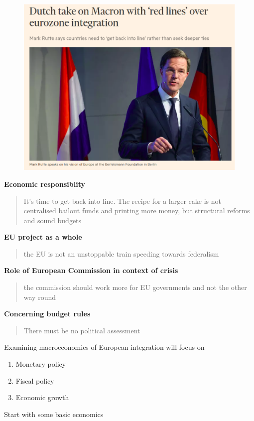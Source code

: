 \documentclass{beamer}
\begin{document}
\begin{frame}
  \begin{figure}
    \includegraphics[scale=.4]{rutte.eps}
  \end{figure}
\end{frame}

\begin{frame}
  \textbf{Economic responsiblity}
  \begin{quote}
    It’s time to get back into line. The recipe for a larger cake is not centralised bailout funds and printing more money, but structural reforms and sound budgets
  \end{quote}
  \textbf{EU project as a whole}
  \begin{quote}
   the EU is not an unstoppable train speeding towards federalism
 \end{quote}
 \textbf{Role of European Commission in context of crisis} 
 \begin{quote}
   the commission should work more for EU governments and not the other way round
 \end{quote}
 \textbf{Concerning budget rules}
 \begin{quote}
   There must be no political assessment
 \end{quote}
\end{frame}

\begin{frame}
  Examining macroeconomics of European integration will focus on
  \begin{enumerate}
    \item Monetary policy
    \item Fiscal policy
    \item Economic growth
  \end{enumerate}
  \medskip
  Start with some basic economics
\end{frame}
\end{document}

